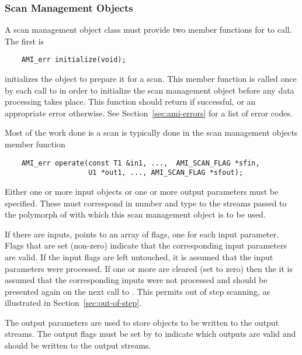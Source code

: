 \subsubsection{Scan Management Objects}  

A scan management object class must provide two member functions for
 to call. The first is
\begin{verbatim}
    AMI_err initialize(void);
\end{verbatim}
 initializes the object to prepare it for a scan.  This
member function is called once by each call to  in order
to initialize the scan management object before any data processing takes
place. This function should return  if
successful, or an appropriate error otherwise. See
Section~\ref{sec:ami-errors} for a list of error codes.

Most of the work done is a scan is typically done in the scan management
objects member function
\begin{verbatim}
    AMI_err operate(const T1 &in1, ...,  AMI_SCAN_FLAG *sfin,
                    U1 *out1, ..., AMI_SCAN_FLAG *sfout);
\end{verbatim}

Either one or more input objects or one or more output parameters must
be specified.  These must correspond in number and type to the streams
passed to the polymorph of  with which this scan
management object is to be used.

If there are inputs,  points to an array of flags, one for each
input parameter.  Flags that are set (non-zero) indicate that the
corresponding input parameters are valid.  If the input flags are left
untouched, it is assumed that the input parameters were processed.  If one
or more are cleared (set to zero) then the it is assumed that the
corresponding inputs were not processed and should be presented again on
the next call to .  This permits out of step
scanning, as illustrated in
Section~\ref{sec:out-of-step}.

The output parameters are used to store objects to be written to the output
streams. The output flags must be set by  to indicate which
outputs are valid and should be written to the output streams. 


